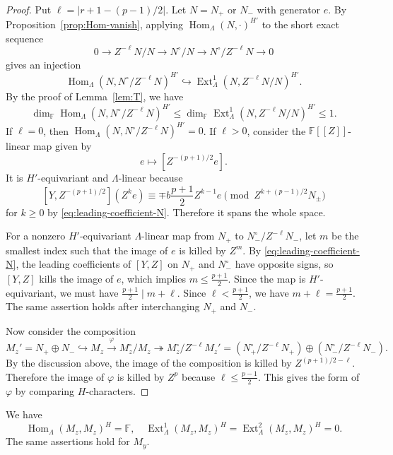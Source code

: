 \documentclass[11pt,a4paper]{article} %
\def\FF{\mathbb{F}}
\def\dim{\operatorname{dim}}
\def\Ext{\operatorname{Ext}} %
\def\Hom{\operatorname{Hom}}
\begin{document}
\begin{proof}
Put $\ell=|r+1-(p-1)/2|$. Let $N=N_+$ or $N_-$ with generator $e$. By Proposition~\ref{prop:Hom-vanish}, applying $\Hom_\Lambda(N,\cdot)^{H'}$ to the short exact sequence
\[
0\longrightarrow Z^{-\ell}N/N\longrightarrow N^\circ/N
\longrightarrow N^\circ/Z^{-\ell}N\longrightarrow0
\]
gives an injection 
\[
\Hom_\Lambda(N,N^\circ/Z^{-\ell}N)^{H'}\hookrightarrow\Ext^1_\Lambda(N,Z^{-\ell}N/N)^{H'}.
\]
By the proof of Lemma~\ref{lem:T}, we have
\[
\dim_\FF\Hom_\Lambda(N,N^\circ/Z^{-\ell}N)^{H'}
\le\dim_\FF\Ext^1_\Lambda(N,Z^{-\ell}N/N)^{H'}\le1.
\]
If $\ell=0$, then $\Hom_\Lambda(N,N^\circ/Z^{-\ell}N)^{H'}=0$. If $\ell>0$, consider the $\FF[[Z]]$-linear map given by
\[
e\longmapsto[Z^{-(p+1)/2}e].
\]
It is $H'$-equivariant and $\Lambda$-linear because 
\[
[Y,Z^{-(p+1)/2}](Z^ke)
\equiv\mp b\frac{p+1}{2}Z^{k-1}e\pmod{Z^{k+(p-1)/2}N_\pm}
\]
for $k\ge0$ by \eqref{eq:leading-coefficient-N}. Therefore it spans the whole space.

For a nonzero $H'$-equivariant $\Lambda$-linear map from
$N_+$ to $N_-^\circ/Z^{-\ell}N_-$, let $m$ be
the smallest index such that the image of $e$ is killed by $Z^m$. By \eqref{eq:leading-coefficient-N}, the leading coefficients of $[Y,Z]$ on $N_+$ and $N_-^\circ$ have opposite signs, so $[Y,Z]$ kills the image of $e$, which implies $m\le\frac{p+1}{2}$. Since the map is $H'$-equivariant, we must have $\frac{p+1}{2}\mid m+\ell$. Since $\ell<\frac{p+1}{2}$, we have $m+\ell=\frac{p+1}{2}$. The same assertion holds after interchanging $N_+$ and $N_-$.

Now consider the composition
\[
M_z'=N_+\oplus N_-\hookrightarrow M_z\xrightarrow{\,\varphi\,}M_z^\circ/M_z\twoheadrightarrow M_z^\circ/Z^{-\ell}M_z'=(N_+^\circ/Z^{-\ell}N_+)\oplus (N_-^\circ/Z^{-\ell}N_-).
\]
By the discussion above, the image of the composition is killed by $Z^{(p+1)/2-\ell}$. Therefore the image of $\varphi$ is killed by $Z^p$ because $\ell\le\frac{p-1}{2}$. This gives the form of $\varphi$ by comparing $H$-characters.
\end{proof}

\begin{proposition}\label{prop:reducible-directional-Ext}
We have
\[
\Hom_\Lambda(M_z,M_z)^H=\FF,
\quad
\Ext^1_\Lambda(M_z,M_z)^H
=\Ext^2_\Lambda(M_z,M_z)^H=0.
\]
The same assertions hold for $M_y$.
\end{proposition}
\end{document}
